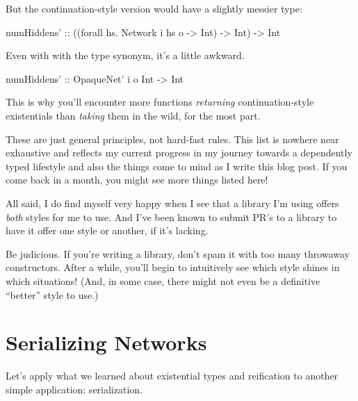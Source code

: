 \documentclass[]{article}
\newenvironment{Shaded}{}{}
\newcommand{\DataTypeTok}[1]{\textcolor[rgb]{0.56,0.13,0.00}{{#1}}}
\newcommand{\OtherTok}[1]{\textcolor[rgb]{0.00,0.44,0.13}{{#1}}}
\newcommand{\FunctionTok}[1]{\textcolor[rgb]{0.02,0.16,0.49}{{#1}}}
\newcommand{\NormalTok}[1]{{#1}}
\begin{document}
\begin{itemize}
  But the continuation-style version would have a slightly messier type:

\begin{Shaded}
\begin{Highlighting}[]
\OtherTok{numHiddens' ::} \NormalTok{((forall hs}\FunctionTok{.} \DataTypeTok{Network} \NormalTok{i hs o }\OtherTok{->} \DataTypeTok{Int}\NormalTok{) }\OtherTok{->} \DataTypeTok{Int}\NormalTok{)}
            \OtherTok{->} \DataTypeTok{Int}
\end{Highlighting}
\end{Shaded}

  Even with with the type synonym, it's a little awkward.

\begin{Shaded}
\begin{Highlighting}[]
\OtherTok{numHiddens' ::} \DataTypeTok{OpaqueNet'} \NormalTok{i o }\DataTypeTok{Int} \OtherTok{->} \DataTypeTok{Int}
\end{Highlighting}
\end{Shaded}

  This is why you'll encounter more functions \emph{returning}
  continuation-style existentials than \emph{taking} them in the wild, for the
  most part.
\end{itemize}

These are just general principles, not hard-fast rules. This list is nowhere
near exhaustive and reflects my current progress in my journey towards a
dependently typed lifestyle and also the things come to mind as I write this
blog post. If you come back in a month, you might see more things listed here!

All said, I do find myself very happy when I see that a library I'm using offers
\emph{both} styles for me to use. And I've been known to submit PR's to a
library to have it offer one style or another, if it's lacking.

Be judicious. If you're writing a library, don't spam it with too many throwaway
constructors. After a while, you'll begin to intuitively see which style shines
in which situations! (And, in some case, there might not even be a definitive
``better'' style to use.)

\section{Serializing Networks}\label{serializing-networks}

Let's apply what we learned about existential types and reification to another
simple application: serialization.
\end{document}
